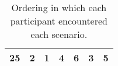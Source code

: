 \begin{table}[]
\begin{tabular}{|c|c|c|c|c|c|c|}
    25                                                       & 2                                                 & 1                                                 & 4                                                 & 6                                                 & 3                                                 & 5                                                 \\ \hline
    \end{tabular}
    \caption{Ordering in which each participant encountered each scenario. }
    \label{tab:ap:ordering}
\end{table}

\begin{sidewaystable}[]
    \center
    \footnotesize
    \begin{tabular}{|c|c|c|c|c|c|c|c|c|c|c|c|c|c|c|c|c|c|c|c|c|c|c|c|c|}
    \hline

\end{tabular}
\end{sidewaystable}
